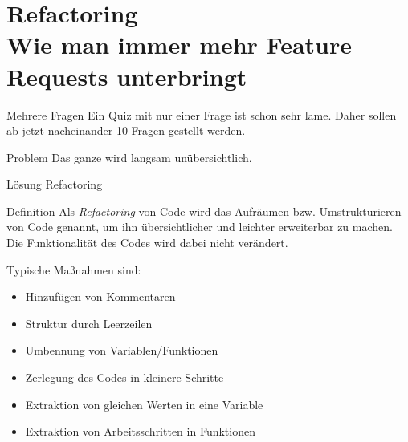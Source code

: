 \section{Refactoring \\ \footnotesize{Wie man immer mehr Feature Requests unterbringt}}

\begin{frame}
	
\begin{block}{Mehrere Fragen}
\vspace{2pt}
Ein Quiz mit nur einer Frage ist schon sehr lame. Daher sollen ab jetzt nacheinander 10 Fragen gestellt werden. 	
\end{block}

\pause 
\vspace{12pt}

\begin{alertblock}{Problem}
\vspace{2pt}
Das ganze wird langsam unübersichtlich.	
\end{alertblock}

\pause
\vspace{12pt}
\begin{exampleblock}{Lösung}
	\vspace{2pt}
Refactoring
\end{exampleblock}

\end{frame}

\begin{frame}
\begin{block}{Definition}
\vspace{2pt}
Als \emph{Refactoring} von Code wird das Aufräumen bzw. Umstrukturieren von Code genannt, um ihn übersichtlicher und leichter erweiterbar zu machen. 
Die Funktionalität des Codes wird dabei nicht verändert. 
\pause

Typische Maßnahmen sind: 
\pause 
\begin{itemize}[<+->]
	\item Hinzufügen von Kommentaren
	\item Struktur durch Leerzeilen
	\item Umbennung von Variablen/Funktionen
	\item Zerlegung des Codes in kleinere Schritte
	\item Extraktion von gleichen Werten in eine Variable
	\item Extraktion von Arbeitsschritten in Funktionen
\end{itemize}
\end{block}
\end{frame}



